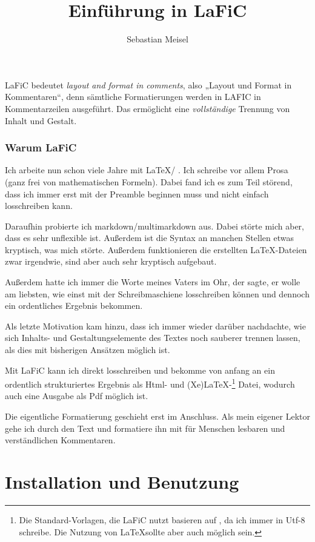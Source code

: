 \documentclass{scrartcl}
\title{Einführung in LaFiC}
\author{Sebastian Meisel}
\begin{document}
\maketitle


LaFiC bedeutet \textit{layout and format in comments}, also „Layout
und Format in Kommentaren“, denn sämtliche Formatierungen
werden in LAFIC in Kommentarzeilen ausgeführt. Das
ermöglicht eine \emph{vollständige} Trennung von Inhalt und
Gestalt.

\section{Warum LaFiC}

Ich arbeite nun schon viele Jahre mit \LaTeX / \XeLaTeX. Ich
schreibe vor allem Prosa (ganz frei von mathematischen
Formeln). Dabei fand ich es zum Teil störend, dass ich immer
erst mit der Preamble beginnen muss und nicht einfach
losschreiben kann.

Daraufhin probierte ich markdown/multimarkdown aus. Dabei
störte mich aber, dass es sehr unflexible ist. Außerdem ist
die Syntax an manchen Stellen etwas kryptisch, was mich
störte. Außerdem funktionieren die erstellten \LaTeX-Dateien
zwar irgendwie, sind aber auch sehr kryptisch aufgebaut.

Außerdem hatte ich immer die Worte meines Vaters im Ohr, der
sagte, er wolle am liebsten, wie einst mit der
Schreibmaschiene losschreiben können und dennoch ein
ordentliches Ergebnis bekommen.

Als letzte Motivation kam hinzu, dass ich immer wieder
darüber nachdachte, wie sich Inhalts- und
Gestaltungselemente des Textes noch sauberer trennen lassen,
als dies mit bisherigen Ansätzen möglich ist.

Mit LaFiC kann ich direkt losschreiben und bekomme von
anfang an ein ordentlich strukturiertes Ergebnis als Html-
und (Xe)LaTeX-\footnote{Die Standard-Vorlagen, die LaFiC nutzt basieren auf \XeLaTeX, da ich immer in Utf-8 schreibe. Die Nutzung von \LaTeX sollte aber auch möglich sein.}\xspace Datei, wodurch auch eine Ausgabe als Pdf
möglich ist.

Die eigentliche Formatierung geschieht erst im
Anschluss. Als mein eigener Lektor gehe ich durch den Text
und formatiere ihn mit für Menschen lesbaren und
verständlichen Kommentaren.

\part{Installation und Benutzung}
\end{document}
